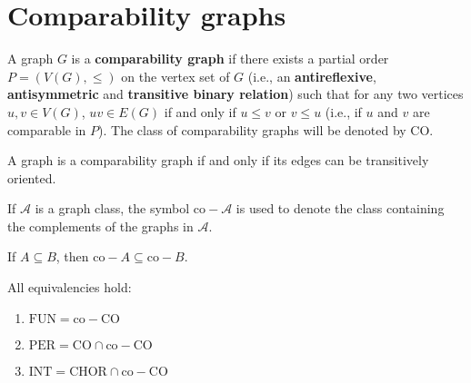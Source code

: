 \section{Comparability graphs}

\begin{defn}
	A graph $G$ is a \textbf{comparability graph} if there exists a partial order $P = (V(G), \leq)$ on the vertex set of $G$ (i.e., an \textbf{antireflexive}, \textbf{antisymmetric} and \textbf{transitive binary relation}) such that for any two vertices $u, v \in V(G)$, $uv \in E(G)$ if and only if $u \leq v$ or $v \leq u$ (i.e., if $u$ and $v$ are comparable in $P$). The class of comparability graphs will be denoted by CO.
\end{defn}

\begin{observ}
	A graph is a comparability graph if and only if its edges can be transitively oriented.
\end{observ}

\begin{notation}
	If $\mathcal{A}$ is a graph class, the symbol $\text{co}-\mathcal{A}$ is used to denote the class containing the complements of the graphs in $\mathcal{A}$.
\end{notation}

\begin{observ}
	If $A \subseteq B$, then $\text{co}-A \subseteq \text{co}-B$.
\end{observ}

\begin{thm}
	All equivalencies hold:
	
	\begin{enumerate}
		\item $\text{FUN} = \text{co}-\text{CO}$
		\item $\text{PER} = \text{CO} \cap \text{co}-\text{CO}$
		\item $\text{INT} = \text{CHOR} \cap \text{co}-\text{CO}$
	\end{enumerate}
\end{thm}

